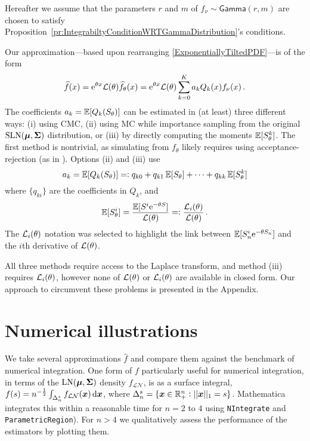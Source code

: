 Hereafter we assume that the parameters $r$ and $m$ of $f_\nu \sim \mathsf{Gamma}(r,m)$ are chosen to satisfy Proposition~\ref{pr:IntegrabiltyConditionWRTGammaDistribution}'s conditions.

Our approximation---based upon rearranging \eqref{ExponentiallyTiltedPDF}---is of the form
\begin{equation}\label{fGammaApprox}
 \widehat{f}(x) = \mathrm{e}^{\theta x} \mathcal{L}(\theta) \widehat{f}_\theta(x) = \mathrm{e}^{\theta x} \mathcal{L}(\theta) \sum_{k=0}^K a_k Q_k(x) f_\nu(x) \,.
\end{equation}
The coefficients $a_k = \operatorname{{\mathbb E}} [Q_k(S_\theta)]$ can be estimated in (at least) three different ways: (i) using CMC, (ii) using MC while importance sampling from the original $\mathrm{SLN}(\bm{\mu}, \bm{\Sigma})$ distribution, or (iii) by directly computing the moments $\operatorname{{\mathbb E}}[S_\theta^k]$. The first method is nontrivial, as simulating from $f_\theta$ likely requires using acceptance-rejection (as in \cite{asmussen2015exponential}). Options (ii) and (iii) use
\begin{equation} \label{eq:expand_coeffs}
	a_k = \operatorname{{\mathbb E}} [Q_k(S_\theta)] =: q_{k0} + q_{k1} \operatorname{{\mathbb E}}[S_\theta] + \dots + q_{kk} \operatorname{{\mathbb E}}[S_\theta^k]
\end{equation}
where $\{q_{ki}\}$ are the coefficients in $Q_k$, and
\[
\operatorname{{\mathbb E}}[S_\theta^i] = \frac{\operatorname{{\mathbb E}}[S^i \mathrm{e}^{-\theta S}]}{\mathcal{L}(\theta)} =: \frac{\mathcal{L}_i(\theta)}{\mathcal{L}(\theta)} \,.
\]
The $\mathcal{L}_i(\theta)$ notation was selected to highlight the link between $\operatorname{{\mathbb E}}[S_n^i \mathrm{e}^{-\theta S_n}]$ and the $i$th derivative of $\mathcal{L}(\theta)$.

All three methods require access to the Laplace transform, and method (iii) requires $\mathcal{L}_i(\theta)$, however none of $\mathcal{L}(\theta)$ or $\mathcal{L}_i(\theta)$ are available in closed form. Our approach to circumvent these problems is presented in the Appendix.

\section{Numerical illustrations}\label{S:numerical}

We take several approximations $\widehat{f}$ and compare them against the benchmark of numerical integration.
One form of $f$ particularly useful for numerical integration, in terms of the $\mathrm{LN}(\bm{\mu}, \bm{\Sigma})$ density $f_{\mathcal{LN}}$, is as a surface integral,
$ f(s) = n^{-\frac12} \int_{\Delta_n^s} f_{\mathcal{LN}}(\bfx) \dif \bfx $,
where $\Delta_n^s = \{ \bm{x} \in \mathbb{R}_+^n : ||\bm{x}||_1 = s \}$. Mathematica integrates this within a reasonable time for $n=2$ to $4$ using \texttt{NIntegrate} and \texttt{ParametricRegion}). For $n > 4$ we qualitatively assess the performance of the estimators by plotting them.

